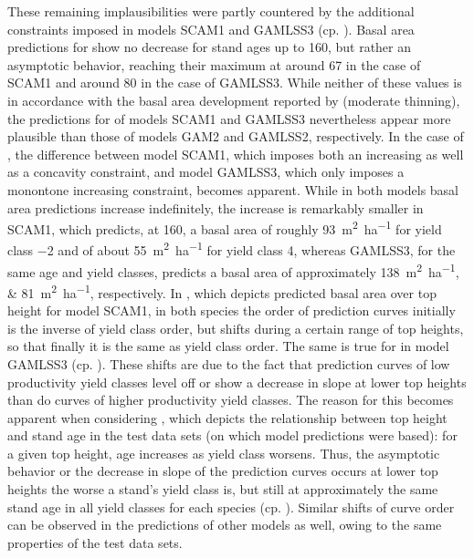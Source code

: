 These remaining implausibilities were partly countered by the additional constraints imposed in models SCAM1 and GAMLSS3 (cp. ). Basal area predictions for \Beech{} show no decrease for stand ages up to \SI{160}{\year}, but rather an asymptotic behavior, reaching their maximum at around \SI{67}{\year} in the case of SCAM1 and around \SI{80}{\year} in the case of GAMLSS3.  While neither of these values is in accordance with the basal area development reported by \textcite{Schober1995} (moderate thinning), the predictions for \Beech{} of models SCAM1 and GAMLSS3 nevertheless appear more plausible than those of models GAM2 and GAMLSS2, respectively.  In the case of \Spruce{}, the difference between model SCAM1, which imposes both an increasing as well as a concavity constraint, and model GAMLSS3, which only imposes a monontone increasing constraint, becomes apparent.  While in both models basal area predictions increase indefinitely, the increase is remarkably smaller in SCAM1, which predicts, at \SI{160}{\year}, a basal area of roughly \SI{93}{\square\meter\per\hectare} for yield class \num{-2} and of about \SI{55}{\square\meter\per\hectare} for yield class \num{4}, whereas GAMLSS3, for the same age and yield classes, predicts a basal area of approximately \SIlist{138;81}{\square\meter\per\hectare}, respectively.
In , which depicts predicted basal area over top height for model SCAM1, in both species the order of prediction curves initially is the inverse of yield class order, but shifts during a certain range of top heights, so that finally it is the same as yield class order.
The same is true for \Beech{} in model GAMLSS3 (cp. ).  These shifts are due to the fact that prediction curves of low productivity yield classes level off or show a decrease in slope at lower top heights than do curves of higher productivity yield classes.
The reason for this becomes apparent when considering , which depicts the relationship between top height and stand age in the test data sets (on which model predictions were based):  for a given top height, age increases as yield class worsens.  Thus, the asymptotic behavior or the decrease in slope of the prediction curves occurs at lower top heights the worse a stand’s yield class is, but still at approximately the same stand age in all yield classes for each species (cp. ).  Similar shifts of curve order can be observed in the predictions of other models as well, owing to the same properties of the test data sets.
